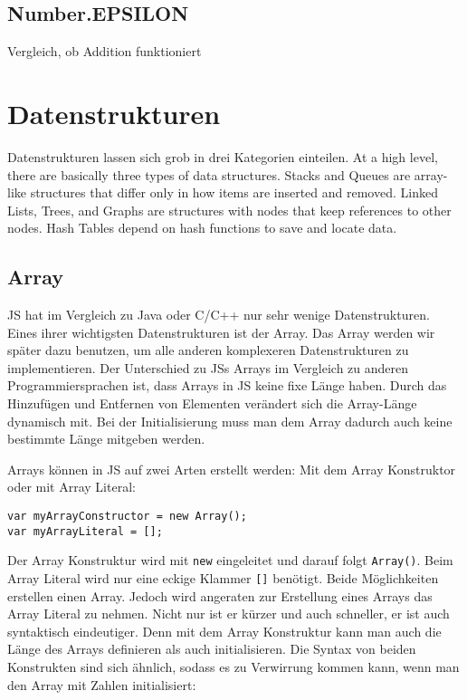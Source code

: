 \documentclass{book}
\begin{document}
\section{Number.EPSILON}
Vergleich, ob Addition funktioniert

\chapter{Datenstrukturen}
Datenstrukturen lassen sich grob in drei Kategorien einteilen. 
At a high level, there are basically three types of data structures. Stacks and Queues are array-like structures that differ only in how items are inserted and removed. Linked Lists, Trees, and Graphs are structures with nodes that keep references to other nodes. Hash Tables depend on hash functions to save and locate data.

\section{Array}
JS hat im Vergleich zu Java oder C/C++ nur sehr wenige Datenstrukturen. Eines ihrer wichtigsten Datenstrukturen ist der Array. Das Array werden wir später dazu benutzen, um alle anderen komplexeren Datenstrukturen zu implementieren. Der Unterschied zu JSs Arrays im Vergleich zu anderen Programmiersprachen ist, dass Arrays in JS keine fixe Länge haben. Durch das Hinzufügen und Entfernen von Elementen verändert sich die Array-Länge dynamisch mit. Bei der Initialisierung muss man dem Array dadurch auch keine bestimmte Länge mitgeben werden.

Arrays können in JS auf zwei Arten erstellt werden: Mit dem Array Konstruktor oder mit Array Literal:
\begin{lstlisting}[caption=Array Konstruktor]
var myArrayConstructor = new Array();
var myArrayLiteral = [];
\end{lstlisting}

Der Array Konstruktur wird mit \lstinline|new| eingeleitet und darauf folgt \lstinline|Array()|. Beim Array Literal wird nur eine eckige Klammer \lstinline|[]| benötigt. Beide Möglichkeiten erstellen einen Array. Jedoch wird angeraten zur Erstellung eines Arrays das Array Literal zu nehmen. Nicht nur ist er kürzer und auch schneller, er ist auch syntaktisch eindeutiger. Denn mit dem Array Konstruktur kann man auch die Länge des Arrays definieren als auch initialisieren. Die Syntax von beiden Konstrukten sind sich ähnlich, sodass es zu Verwirrung kommen kann, wenn man den Array mit Zahlen initialisiert:
\end{document}
